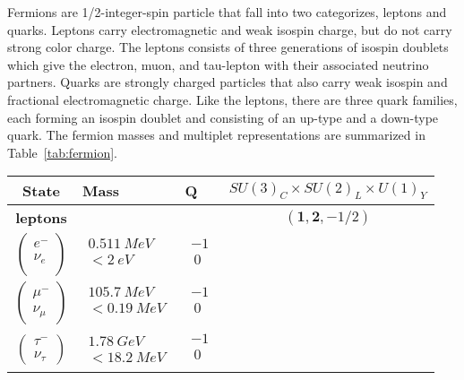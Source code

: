 Fermions are 1/2-integer-spin particle that fall into two categorizes, leptons and quarks.  Leptons carry electromagnetic and weak isospin charge, but do not carry strong color charge.  The leptons consists of three generations of isospin doublets which give the electron, muon, and tau-lepton with their associated neutrino partners.  Quarks are strongly charged particles that also carry weak isospin and fractional electromagnetic charge.  Like the leptons, there are three quark families, each forming an isospin doublet and consisting of an up-type and a down-type quark.  The fermion masses and multiplet representations are summarized in Table~\ref{tab:fermion}.
\begin{table}[!htb]
\centering
\small
\begin{tabular}{|cllc|}
\hline
State  & Mass & Q & $SU(3)_{C} \times SU(2)_{L} \times U(1)_{Y}$ \\
\hline \hline
\textbf{leptons}&&&$(\mathbf{1}, \mathbf{2}, -1/2)$\\
\hline
$\begin{pmatrix}
e^- \\
\nu_e\\
\end{pmatrix}$
&$\begin{matrix}
0.511~MeV \\
<2~eV\\
\end{matrix}$
&$\begin{matrix}
-1\\
~0\\
\end{matrix}$&\\
\hline
$\begin{pmatrix} \mu^-\\ \nu_\mu \end{pmatrix}$
 &$\begin{matrix} 105.7~MeV\\  <0.19~MeV \\ \end{matrix}$
  &$\begin{matrix} -1\\  ~0 \\ \end{matrix}$&\\
\hline
$\begin{pmatrix} \tau^- \\ \nu_\tau \end{pmatrix}$
&$\begin{matrix} 1.78~GeV  \\ <18.2~MeV \end{matrix}$
  &$\begin{matrix} -1\\  ~0 \\ \end{matrix}$&\\  
\hline 


\end{tabular}
\end{table}
